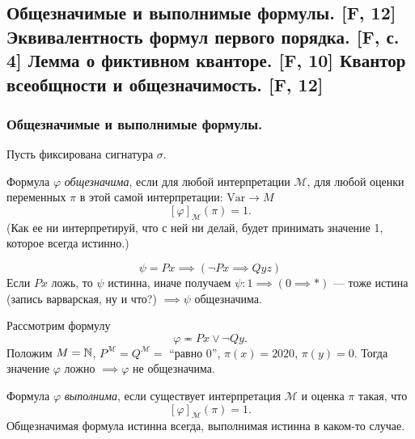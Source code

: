 \documentclass[a4paper, fleqn]{article}
\begin{document}
    \subsection{Общезначимые и выполнимые формулы. [F, 12] Эквивалентность формул первого порядка. [F, с. 4] Лемма о фиктивном кванторе. [F, 10] Квантор всеобщности и общезначимость. [F, 12]}
    
    \subsubsection{Общезначимые и выполнимые формулы.}

    Пусть фиксирована сигнатура $\sigma$. 
    \begin{definition}
        Формула $\varphi$ {\it общезначима}, если для любой интерпретации $\mathcal{M}$, для 
        любой оценки переменных $\pi$ в этой самой интерпретации: $\text{Var} \to M$ 
        $$
            [\varphi]_{\mathcal{M}}(\pi) = 1.
        $$
        (Как ее ни интерпретируй, что с ней ни делай, будет принимать значение 1, 
        которое всегда истинно.)
    \end{definition}

    \begin{example}
        $$
            \psi = Px \implies (\neg Px \implies Qyz)
        $$
        Если $Px$ ложь, то $\psi$ истинна, иначе получаем $\psi \colon 1 \implies 
        (0 \implies *)$ --- тоже истина (запись варварская, ну и что?) $\implies 
        \psi $ общезначима. 
    \end{example}
    \begin{example}
        Рассмотрим формулу
        $$
            \varphi \eqcirc Px \lor \neg Qy.
        $$
        Положим $M = \mathbb{N}$, $P^{\mathcal{M}} = Q^{\mathcal{M}} =$ 
        ``равно 0'', $\pi(x) = 2020$, $\pi(y) = 0$.
        Тогда значение $\varphi$ ложно $ \implies \varphi $ не общезначима.
    \end{example}

    \begin{definition}
        Формула $\varphi$ {\it выполнима}, если существует интерпретация $\mathcal{M}$ 
        и оценка $\pi$ такая, что
        $$
            [\varphi]_{\mathcal{M}}(\pi) = 1.
        $$
        Общезначимая формула истинна всегда, выполнимая истинна в каком-то случае.
    \end{definition}
\end{document}
